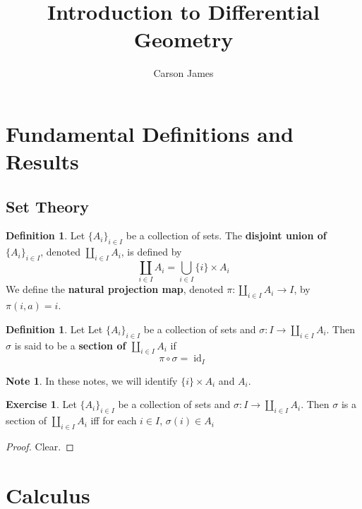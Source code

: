 \documentclass[12pt]{amsart}
\theoremstyle{definition}
\newtheorem{defn}[definition]{Definition}
\newtheorem{note}[definition]{Note}
\newtheorem{ex}[definition]{Exercise}
\newcommand{\sig}{\sigma}
\DeclareMathOperator{\id}{id}
\begin{document}
	
	\title{Introduction to Differential Geometry}
	\author{Carson James}
	\maketitle
	
	\tableofcontents
	
	\section{Fundamental Definitions and Results}

	\subsection{Set Theory}
	
	\begin{defn}
		Let $\{A_i\}_{i \in I}$ be a collection of sets. The \textbf{disjoint union of} $\{A_i\}_{i \in I}$, denoted $\coprod\limits_{i \in I} A_i$, is defined by $$\coprod_{i \in I}A_i = \bigcup_{i\in I} \{i\} \times A_i$$ 
		We define the \textbf{natural projection map}, denoted $\pi: \coprod\limits_{i \in I} A_i \rightarrow I$, by $\pi(i, a) = i$.
	\end{defn}

	\begin{defn}
		Let Let $\{A_i\}_{i \in I}$ be a collection of sets and $\sig: I \rightarrow \coprod\limits_{i \in I} A_i$. Then $\sig$ is said to be a \textbf{section of $\coprod\limits_{i \in I} A_i$} if $$\pi \circ \sig = \id_I$$
	\end{defn}

	\begin{note}
		In these notes, we will identify $\{i\} \times A_i$ and $A_i$.
	\end{note}

	\begin{ex}
		Let $\{A_i\}_{i \in I}$ be a collection of sets and $\sig: I \rightarrow \coprod\limits_{i \in I} A_i$. Then $\sig$ is a section of $\coprod\limits_{i \in I} A_i$ iff for each $i \in I$, $\sig(i) \in A_i$
	\end{ex}
	
	\begin{proof}
		Clear.
	\end{proof}
	
	\section{Calculus}
	
\end{document}
